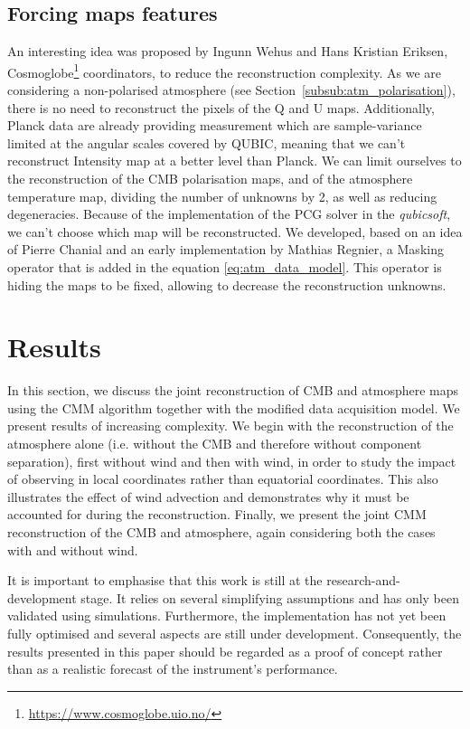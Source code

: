 \documentclass[a4paper,11pt]{article}
\begin{document}
\subsection{Forcing maps features}
\label{sec:forcing_features}

An interesting idea was proposed by Ingunn Wehus and Hans Kristian Eriksen, Cosmoglobe\footnote{\url{https://www.cosmoglobe.uio.no/}} coordinators, to reduce the reconstruction complexity. As we are considering a non-polarised atmosphere (see Section~\ref{subsub:atm_polarisation}), there is no need to reconstruct the pixels of the Q and U maps. Additionally, Planck data are already providing measurement which are sample-variance limited at the angular scales covered by QUBIC, meaning that we can't reconstruct Intensity map at a better level than Planck. We can limit ourselves to the reconstruction of the CMB polarisation maps, and of the atmosphere temperature map, dividing the number of unknowns by 2, as well as reducing degeneracies. 
Because of the implementation of the PCG solver in the \emph{qubicsoft}, we can't choose which map will be reconstructed. We developed, based on an idea of Pierre Chanial and an early implementation by Mathias Regnier, a Masking operator that is added in the equation \ref{eq:atm_data_model}. This operator is hiding the maps to be fixed, allowing to decrease the reconstruction unknowns. 

\section{Results}
\label{sec:results}

In this section, we discuss the joint reconstruction of CMB and atmosphere maps using the CMM algorithm together with the modified data acquisition model.
We present results of increasing complexity. We begin with the reconstruction of the atmosphere alone (i.e. without the CMB and therefore without component separation), first without wind and then with wind, in order to study the impact of observing in local coordinates rather than equatorial coordinates. This also illustrates the effect of wind advection and demonstrates why it must be accounted for during the reconstruction. Finally, we present the joint CMM reconstruction of the CMB and atmosphere, again considering both the cases with and without wind.

It is important to emphasise that this work is still at the research-and-development stage. It relies on several simplifying assumptions and has only been validated using simulations. Furthermore, the implementation has not yet been fully optimised and several aspects are still under development. Consequently, the results presented in this paper should be regarded as a proof of concept rather than as a realistic forecast of the instrument's performance.
\end{document}
